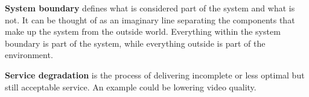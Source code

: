 \textbf{System boundary} defines what is considered part of the system and what is not. It can be thought of as an imaginary line separating the components that make up the system from the outside world. Everything within the system boundary is part of the system, while everything outside is part of the environment.

\textbf{Service degradation} is the process of delivering incomplete or less optimal but still acceptable service. An example could be lowering video quality. 

